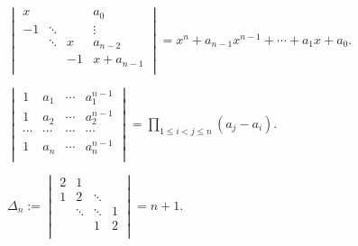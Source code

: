 \begin{frame}
\begin{example} \small
$\begin{vmatrix}
x&      &      &      a_0\\
-1&\ddots&      &   \vdots\\
&\ddots&     x&  a_{n-2}\\
&      &    -1&x+a_{n-1}\\
\end{vmatrix}=x^n+a_{n-1}x^{n-1}+\cdots+a_1x+a_0$.
\end{example}
\pp
\begin{example} \small
$\begin{vmatrix}
1&     a_1&  \cdots&  a_1^{n-1}\\
1&     a_2&  \cdots&  a_2^{n-1}\\
\cdots&  \cdots&  \cdots&     \cdots\\
1&     a_n&  \cdots&  a_n^{n-1}\\
\end{vmatrix}=\prod\limits_{1\leq i<j\leq n} (a_j-a_i)$.
\end{example}
\pp
\begin{example} \small
$\Delta_n:=\begin{vmatrix}
2&     1&      &  \\
1&     2&\ddots&  \\
&\ddots&\ddots& 1\\
&      &     1& 2\\
\end{vmatrix}=n+1$.
\end{example}
\end{frame}



